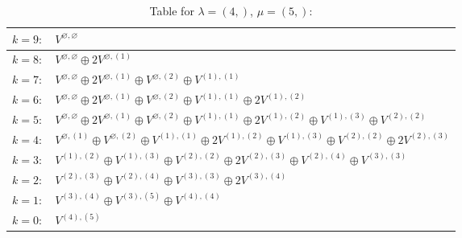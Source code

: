 \documentclass[a4paper,12pt]{article}
\begin{document}
\renewcommand{\arraystretch}{1.6} 
\begin{table}[H]
\centering
\caption{Table for $\lambda = (4,)$, $\mu = (5,)$:}
\begin{tabular}{|>{\centering\arraybackslash}p{15cm}|}
\hline
 $k = 9: \quad V^{\varnothing, \varnothing} $ \\ \hline
 $k = 8: \quad V^{\varnothing, \varnothing} \oplus 2 V^{\varnothing, (1)} $ \\ \hline
 $k = 7: \quad V^{\varnothing, \varnothing} \oplus 2 V^{\varnothing, (1)} \oplus V^{\varnothing, (2)} \oplus V^{(1), (1)} $ \\ \hline
 $k = 6: \quad V^{\varnothing, \varnothing} \oplus 2 V^{\varnothing, (1)} \oplus V^{\varnothing, (2)} \oplus V^{(1), (1)} \oplus 2 V^{(1), (2)} $ \\ \hline
 $k = 5: \quad V^{\varnothing, \varnothing} \oplus 2 V^{\varnothing, (1)} \oplus V^{\varnothing, (2)} \oplus V^{(1), (1)} \oplus 2 V^{(1), (2)} \oplus V^{(1), (3)} \oplus V^{(2), (2)} $ \\ \hline
 $k = 4: \quad V^{\varnothing, (1)} \oplus V^{\varnothing, (2)} \oplus V^{(1), (1)} \oplus 2 V^{(1), (2)} \oplus V^{(1), (3)} \oplus V^{(2), (2)} \oplus 2 V^{(2), (3)} $ \\ \hline
 $k = 3: \quad V^{(1), (2)} \oplus V^{(1), (3)} \oplus V^{(2), (2)} \oplus 2 V^{(2), (3)} \oplus V^{(2), (4)} \oplus V^{(3), (3)} $ \\ \hline
 $k = 2: \quad V^{(2), (3)} \oplus V^{(2), (4)} \oplus V^{(3), (3)} \oplus 2 V^{(3), (4)} $ \\ \hline
 $k = 1: \quad V^{(3), (4)} \oplus V^{(3), (5)} \oplus V^{(4), (4)} $ \\ \hline
 $k = 0: \quad V^{(4), (5)} $ \\ \hline
\end{tabular}
\end{table}
\end{document}

